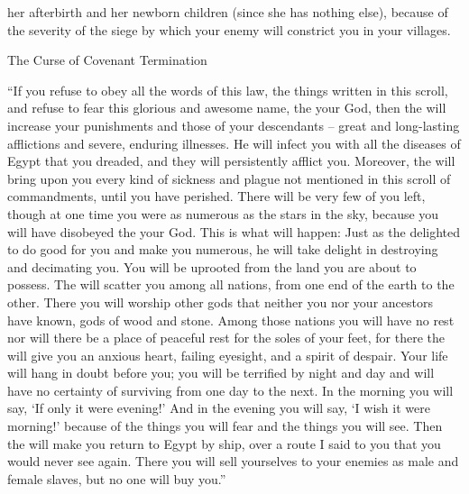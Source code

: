 {her afterbirth
and her newborn
children
(since
she has nothing else), because
of the severity
of the siege
by which
your enemy
will constrict
you in your villages.
\par }{\SH The Curse of Covenant Termination
\par }{\PP {}“If
you refuse
to obey
all
the words
of this
law,
the things written
in this scroll,
and refuse to fear
this
glorious
and awesome
name,
the {}
your God,
then the
{}
will increase
your punishments
and those of your descendants
– great
and long-lasting
afflictions
and severe,
enduring
illnesses.
He will infect you with all
the diseases
of Egypt
that
you dreaded,
and they will persistently
afflict you.
Moreover,
the {}
will bring upon
you every
kind of sickness
and plague
not
mentioned in
this scroll
of commandments,
until
you have perished.
There
will be very few
of you left,
though at one time you were
as numerous
as the stars
in the sky,
because
you will have
disobeyed
the {}
your God.
This is what will happen: Just
as the
{}
delighted
to do good
for you and make you numerous,
he
will take delight
in
destroying
and decimating
you. You will be uprooted
from the land
you
are about
to possess.
The
{}
will scatter
you among all
nations,
from one end
of the earth
to
the other.
There
you will worship
other
gods
that
neither you
nor your ancestors
have known,
gods of wood
and stone.
Among those
nations
you will have no
rest
nor
will there be
a place of peaceful rest
for the soles
of your feet,
for there
the {}
will give
you an anxious
heart,
failing
eyesight,
and a spirit
of despair.
Your life
will hang
in doubt before
you; you will be terrified
by night
and day
and will have no
certainty
of surviving from one day to the next.
In the morning
you will say,
‘If only
it
were evening!’ And in the evening
you will say,
‘I wish
it
were
morning!’ because
of the things
you will fear
and the things
you will see.
Then the
{}
will make you return
to Egypt
by
ship,
over a route
I said
to you that you would never
see
again.
There
you will sell
yourselves to your enemies
as male and female
slaves,
but no
one will buy you.”

}
